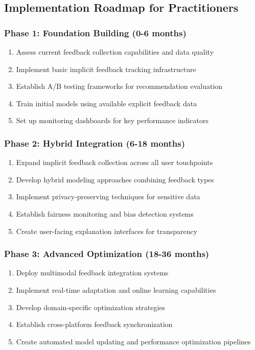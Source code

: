 \subsection{Implementation Roadmap for Practitioners}

\subsubsection{Phase 1: Foundation Building (0-6 months)}

\begin{enumerate}
    \item Assess current feedback collection capabilities and data quality
    \item Implement basic implicit feedback tracking infrastructure
    \item Establish A/B testing frameworks for recommendation evaluation
    \item Train initial models using available explicit feedback data
    \item Set up monitoring dashboards for key performance indicators
\end{enumerate}

\subsubsection{Phase 2: Hybrid Integration (6-18 months)}

\begin{enumerate}
    \item Expand implicit feedback collection across all user touchpoints
    \item Develop hybrid modeling approaches combining feedback types
    \item Implement privacy-preserving techniques for sensitive data
    \item Establish fairness monitoring and bias detection systems
    \item Create user-facing explanation interfaces for transparency
\end{enumerate}

\subsubsection{Phase 3: Advanced Optimization (18-36 months)}

\begin{enumerate}
    \item Deploy multimodal feedback integration systems
    \item Implement real-time adaptation and online learning capabilities
    \item Develop domain-specific optimization strategies
    \item Establish cross-platform feedback synchronization
    \item Create automated model updating and performance optimization pipelines
\end{enumerate}

